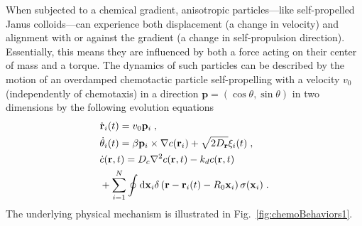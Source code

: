 \documentclass[a4paper, amsfonts, amssymb, amsmath, reprint, showkeys, showpacs, nofootinbib, twoside]{revtex4-2}
\begin{document}
When subjected to a chemical gradient, anisotropic particles—like self-propelled Janus colloids—can experience both displacement (a change in velocity) and alignment with or against the gradient (a change in self-propulsion direction). Essentially, this means they are influenced by both a force acting on their center of mass and a torque. The dynamics of such particles can be described by the motion of an overdamped chemotactic particle self-propelling with a velocity $v_0$ (independently of chemotaxis) in a direction $\mathbf{p}=\left(\cos\theta, \sin\theta\right)$ in two dimensions by the following evolution equations \cite{PhysRevLett.118.268001}
\begin{subequations}
    \label{eq:JanusChemotaxis}
    \begin{align}
        &\dot{\mathbf{r}}_i(t)=v_0\mathbf{p}_i\;,\\
        &\dot{\theta}_i(t)=\beta \mathbf{p}_i\times \nabla c(\mathbf{r}_i)+\sqrt{2D_{\mathbf{r}}}\xi _i(t)\;,\\
        &\dot{c}(\mathbf{r},t)=D_c\nabla ^2c(\mathbf{r},t)-k_dc(\mathbf{r},t)\notag\\
        &+\sum_{i=1}^N{\oint{\mathrm{d}\mathbf{x}_i\delta \left(\mathbf{r}-\mathbf{r}_i(t)-R_0\mathbf{x}_i\right)\sigma (\mathbf{x}_i)}}\;.
    \end{align}
\end{subequations}
The underlying physical mechanism is illustrated in Fig.~\ref{fig:chemoBehaviors1}. 
\end{document}
